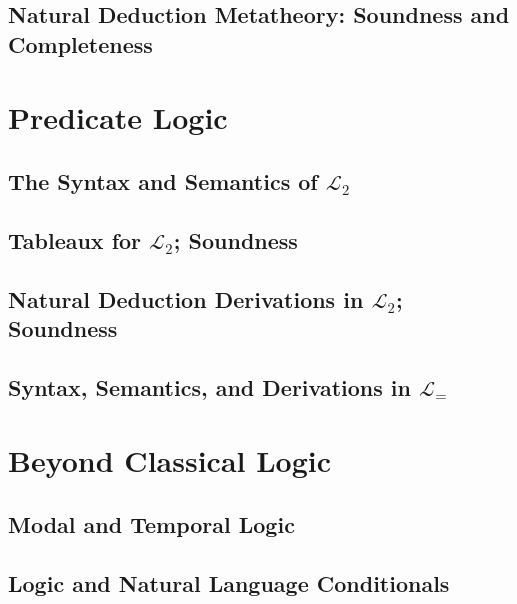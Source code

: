 \documentclass[openany,leqno,10pt]{book}
\theoremstyle{break}
\theoremstyle{definition}
\theoremstyle{remark}
\newcommand{\ltwo}{\ensuremath{\mathcal{L}_{2}}}
\begin{document}
\chapter[Natural Deduction Metatheory]{Natural Deduction Metatheory: Soundness and Completeness}\label{c:ndmeta} %
 

\part{Predicate Logic} \label{p:l2}


\chapter{The Syntax and Semantics of \texorpdfstring{$\mathcal{L}_{2}$}{L2}}\label{c:l2} %
 

\newpage

\chapter[Tableaux for \texorpdfstring{$\mathcal{L}_{2}$}{L2}]{Tableaux for \texorpdfstring{\ltwo}{L2}; Soundness}\label{c:l2tabl} %
% 

\chapter[Natural Deduction in \texorpdfstring{$\mathcal{L}_{2}$}{L2}]{Natural Deduction Derivations in \texorpdfstring{\ltwo}{L2}; Soundness}\label{c:l2nd} %
 

\chapter{Syntax, Semantics, and Derivations in \texorpdfstring{$\mathcal{L}_{=}$}{L=}}\label{c:lequals} %
 


\part{Beyond Classical Logic} \label{p:beyond}

\chapter{Modal and Temporal Logic} \label{c:modal}
% 

\chapter{Logic and Natural Language Conditionals}\label{c:cond} %
 
\end{document}
